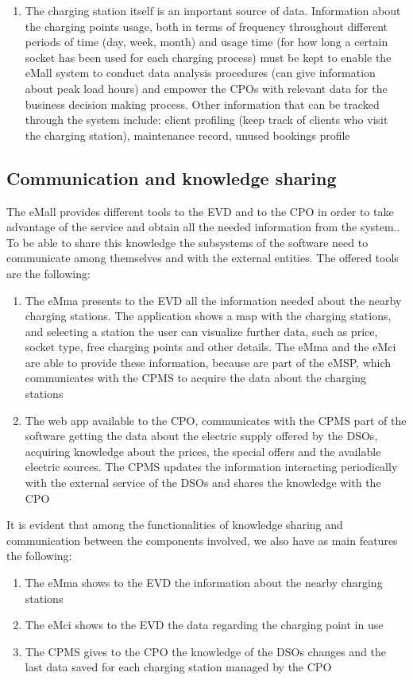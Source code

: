 \begin{enumerate}
    \item The charging station itself is an important source of data. Information about the charging points usage, both in terms of frequency throughout different periods of time (day, week, month) and usage time (for how long a certain socket has been used for each charging process) must be kept to enable the eMall system to conduct data analysis procedures (can give information about peak load hours) and empower the CPOs with relevant data for the business decision making process. Other information that can be tracked through the system include: client profiling (keep track of clients who visit the charging station), maintenance record, unused bookings profile
\end{enumerate}

\subsection{Communication and knowledge sharing}
The eMall provides different tools to the EVD and to the CPO in order to take advantage of the service and obtain all the needed information from the system.. To be able to share this knowledge the subsystems of the software need to communicate among themselves and with the external entities. The offered tools are the following:
\begin{enumerate}
    \item The eMma presents to the EVD all the information needed about the nearby charging stations. The application shows a map with the charging stations, and selecting a station the user can visualize further data, such as price, socket type, free charging points and other details. The eMma and the eMci are able to provide these information, because are part of the eMSP, which communicates with the CPMS to acquire the data about the charging stations 
    \item The web app available to the CPO, communicates with the CPMS part of the software getting the data about the electric supply offered by the DSOs, acquiring knowledge about the prices, the special offers and the available electric sources. The CPMS updates the information interacting periodically with the external service of the DSOs and shares the knowledge with the CPO
\end{enumerate}
It is evident that among the functionalities of knowledge sharing and communication between the components involved, we also have as main features the following:
\begin{enumerate}
    \item The eMma shows to the EVD the information about the nearby charging stations
    \item The eMci shows to the EVD the data regarding the charging point in use
    \item The CPMS gives to the CPO the knowledge of the DSOs changes and the last data saved for each charging station managed by the CPO
\end{enumerate}

